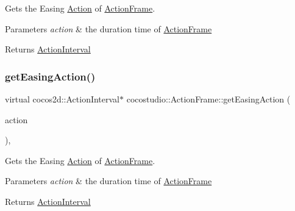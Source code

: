 Gets the Easing \hyperlink{classAction}{Action} of \hyperlink{classcocostudio_1_1ActionFrame}{Action\+Frame}.


\begin{DoxyParams}{Parameters}
{\em action} & the duration time of \hyperlink{classcocostudio_1_1ActionFrame}{Action\+Frame}\\
\hline
\end{DoxyParams}
\begin{DoxyReturn}{Returns}
\hyperlink{classActionInterval}{Action\+Interval} 
\end{DoxyReturn}
\mbox{\label{classcocostudio_1_1ActionFrame_ac3846843beb99f0baa38d3473b7961e0}} 
\subsubsection{\texorpdfstring{get\+Easing\+Action()}{getEasingAction()}\hspace{0.1cm}{\footnotesize\ttfamily [2/2]}}
{\footnotesize\ttfamily virtual cocos2d\+::\+Action\+Interval$\ast$ cocostudio\+::\+Action\+Frame\+::get\+Easing\+Action (\begin{DoxyParamCaption}\item[{cocos2d\+::\+Action\+Interval $\ast$}]{action }\end{DoxyParamCaption})\hspace{0.3cm}{\ttfamily [protected]}, {\ttfamily [virtual]}}

Gets the Easing \hyperlink{classAction}{Action} of \hyperlink{classcocostudio_1_1ActionFrame}{Action\+Frame}.


\begin{DoxyParams}{Parameters}
{\em action} & the duration time of \hyperlink{classcocostudio_1_1ActionFrame}{Action\+Frame}\\
\hline
\end{DoxyParams}
\begin{DoxyReturn}{Returns}
\hyperlink{classActionInterval}{Action\+Interval} 
\end{DoxyReturn}
\mbox{\label{classcocostudio_1_1ActionFrame_ac9cbd5d9b6751f4802b83a35941b680f}} 
